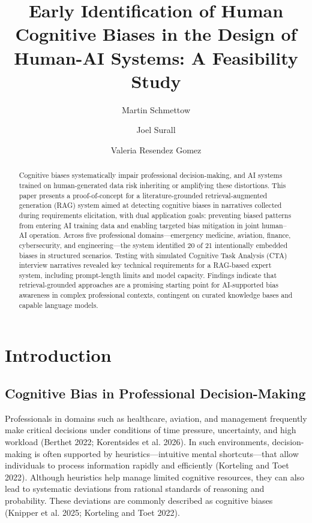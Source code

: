 \documentclass[
  manuscript,
  anonymous,
  review]{acmart}
\title{Early Identification of Human Cognitive Biases in the Design of Human-AI Systems: A Feasibility Study}
\author{Martin Schmettow \and Joel Surall \and Valeria Resendez Gomez}
\date{}
\begin{document}
\begin{abstract}
Cognitive biases systematically impair professional decision-making, and
AI systems trained on human-generated data risk inheriting or amplifying
these distortions. This paper presents a proof-of-concept for a
literature-grounded retrieval-augmented generation (RAG) system aimed at
detecting cognitive biases in narratives collected during requirements
elicitation, with dual application goals: preventing biased patterns
from entering AI training data and enabling targeted bias mitigation in
joint human--AI operation. Across five professional domains---emergency
medicine, aviation, finance, cybersecurity, and engineering---the system
identified 20 of 21 intentionally embedded biases in structured
scenarios. Testing with simulated Cognitive Task Analysis (CTA)
interview narratives revealed key technical requirements for a RAG-based
expert system, including prompt-length limits and model capacity.
Findings indicate that retrieval-grounded approaches are a promising
starting point for AI-supported bias awareness in complex professional
contexts, contingent on curated knowledge bases and capable language
models.
\end{abstract}
\maketitle
\section{Introduction}\label{introduction}

\subsection{Cognitive Bias in Professional
Decision-Making}\label{cognitive-bias-in-professional-decision-making}

Professionals in domains such as healthcare, aviation, and management
frequently make critical decisions under conditions of time pressure,
uncertainty, and high workload (Berthet 2022; Korentsides et al. 2026).
In such environments, decision-making is often supported by
heuristics---intuitive mental shortcuts---that allow individuals to
process information rapidly and efficiently (Korteling and Toet 2022).
Although heuristics help manage limited cognitive resources, they can
also lead to systematic deviations from rational standards of reasoning
and probability. These deviations are commonly described as cognitive
biases (Knipper et al. 2025; Korteling and Toet 2022).
\end{document}
